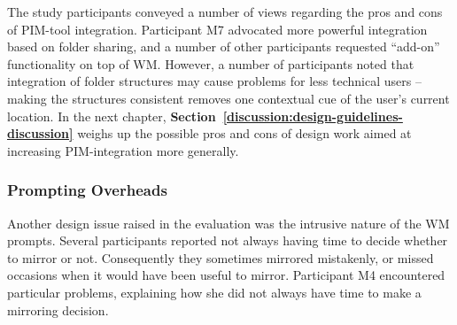 The study participants conveyed a number of views regarding the pros and cons of PIM-tool integration.  Participant M7 advocated more powerful integration based on folder sharing, and a number of other participants requested ``add-on'' functionality on top of WM.  However, a number of participants noted that integration of folder structures may cause problems for less technical users -- making the structures consistent removes one contextual cue of the user's current location.
In the next chapter, \textbf{Section~\ref{discussion:design-guidelines-discussion}} weighs up the possible pros and cons of design work aimed at increasing PIM-integration more generally.  %



\subsubsection{Prompting Overheads}

Another design issue raised in the evaluation was the intrusive nature of the WM prompts.  Several participants reported not always having time to decide whether to mirror or not.  Consequently they sometimes mirrored mistakenly, or missed occasions when it would have been useful to mirror.  Participant M4 encountered particular problems, explaining how she did not always have time to make a mirroring decision.

